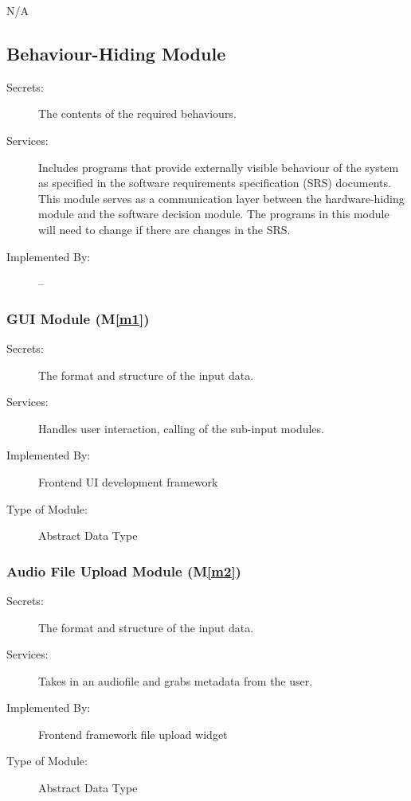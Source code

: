\documentclass[12pt, titlepage]{article}
\newcommand{\mref}[1]{M\ref{#1}}
\begin{document}
\begin{description}
\item[N/A]
\end{description}

\subsection{Behaviour-Hiding Module}

\begin{description}
\item[Secrets:]The contents of the required behaviours.
\item[Services:]Includes programs that provide externally visible behaviour of
  the system as specified in the software requirements specification (SRS)
  documents. This module serves as a communication layer between the
  hardware-hiding module and the software decision module. The programs in this
  module will need to change if there are changes in the SRS.
\item[Implemented By:] --
\end{description}

\subsubsection{GUI Module (\mref{m1})}

\begin{description}
\item[Secrets:] The format and structure of the input data.
\item[Services:] Handles user interaction, calling of the sub-input modules. 
\item[Implemented By:] Frontend UI development framework
\item[Type of Module:] Abstract Data Type
\end{description}

\subsubsection{Audio File Upload Module (\mref{m2})}

\begin{description}
\item[Secrets:] The format and structure of the input data.
\item[Services:] Takes in an audiofile and grabs metadata from the user. 
\item[Implemented By:] Frontend framework file upload widget
\item[Type of Module:] Abstract Data Type
\end{description}
\end{document}
